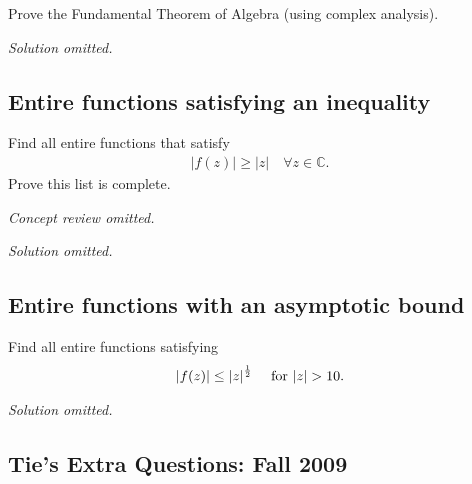 \begin{problem}[?]

Prove the Fundamental Theorem of Algebra (using complex analysis).

\end{problem}

\emph{Solution omitted.}

\hypertarget{entire-functions-satisfying-an-inequality}{%
\subsection{Entire functions satisfying an
inequality}\label{entire-functions-satisfying-an-inequality}}

\begin{problem}[?]

Find all entire functions that satisfy
\begin{align*}
{\left\lvert {f(z)} \right\rvert} \geq {\left\lvert {z} \right\rvert} \quad \forall z\in {\mathbb{C}}
.\end{align*}
Prove this list is complete.

\end{problem}

\emph{Concept review omitted.}

\emph{Solution omitted.}

\hypertarget{entire-functions-with-an-asymptotic-bound}{%
\subsection{Entire functions with an asymptotic
bound}\label{entire-functions-with-an-asymptotic-bound}}

\begin{problem}[?]

Find all entire functions satisfying
\begin{align*}
{\left\lvert {f(z)} \right\rvert} \leq {\left\lvert {z} \right\rvert}^{1\over 2} \quad\text{ for } {\left\lvert {z} \right\rvert} > 10
.\end{align*}

\end{problem}

\emph{Solution omitted.}

\hypertarget{ties-extra-questions-fall-2009-2}{%
\subsection{Tie's Extra Questions: Fall
2009}\label{ties-extra-questions-fall-2009-2}}

